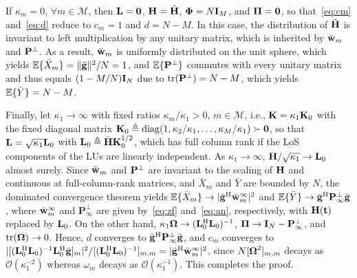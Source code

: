 \documentclass[journal]{IEEEtran}
\begin{document}
If $\kappa_m=0$, $\forall m\in\mathcal M$, then $\mathbf{L}=\mathbf 0$, $\mathbf{H}=\tilde{\mathbf{H}}$, $\boldsymbol{\Phi}=N\mathbf{I}_M$, and $\boldsymbol{\Pi}=\mathbf 0$, so that~\eqref{eq:cm} and~\eqref{eq:d} reduce to $c_m=1$ and $d=N-M$. In this case, the distribution of $\tilde{\mathbf{H}}$ is invariant to left multiplication by any unitary matrix, which is inherited by $\bar{\mathbf{w}}_m$ and $\mathbf{P}^{\perp}$. As a result, $\bar{\mathbf{w}}_m$ is uniformly distributed on the unit sphere, which yields $\mathbb{E}\{\bar X_m\}=\|\bar{\mathbf{g}}\|^2/N=1$, and $\mathbb{E}\{\mathbf{P}^{\perp}\}$ commutes with every unitary matrix and thus equals $(1-M/N)\mathbf{I}_N$ due to $\mathrm{tr}(\mathbf{P}^{\perp})=N-M$, which yields $\mathbb{E}\{\bar Y\}=N-M$.

Finally, let $\kappa_1\to\infty$ with fixed ratios $\kappa_m/\kappa_1>0$, $m\in\mathcal M$, i.e., $\mathbf{K}=\kappa_1\mathbf{K}_0$ with the fixed diagonal matrix $\mathbf{K}_0\triangleq\mathrm{diag}(1,\kappa_2/\kappa_1,\ldots,\kappa_M/\kappa_1)\succ\mathbf 0$, so that $\mathbf{L}=\sqrt{\kappa_1}\mathbf{L}_0$ with $\mathbf{L}_0\triangleq\bar{\mathbf{H}}\mathbf{K}_0^{1/2}$, which has full column rank if the LoS components of the LUs are linearly independent. As $\kappa_1\to\infty$, $\mathbf{H}/\sqrt{\kappa_1}\to\mathbf{L}_0$ almost surely. Since $\bar{\mathbf{w}}_m$ and $\mathbf{P}^{\perp}$ are invariant to the scaling of $\mathbf{H}$ and continuous at full-column-rank matrices, and $\bar X_m$ and $\bar Y$ are bounded by $N$, the dominated convergence theorem yields $\mathbb{E}\{\bar X_m\}\to|\bar{\mathbf{g}}^{\mathrm H}\bar{\mathbf{w}}_m^{\infty}|^2$ and $\mathbb{E}\{\bar Y\}\to\bar{\mathbf{g}}^{\mathrm H}\mathbf P_{\infty}^\perp\bar{\mathbf{g}}$, where $\bar{\mathbf{w}}_m^{\infty}$ and $\mathbf P_{\infty}^\perp$ are given by~\eqref{eq:zf} and~\eqref{eq:an}, respectively, with $\mathbf{H}(\mathbf{t})$ replaced by $\mathbf{L}_0$. On the other hand, $\kappa_1\boldsymbol{\Omega}\to(\mathbf{L}_0^{\mathrm H}\mathbf{L}_0)^{-1}$, $\boldsymbol{\Pi}\to\mathbf{I}_N-\mathbf P_{\infty}^\perp$, and $\mathrm{tr}(\boldsymbol{\Omega})\to0$. Hence, $d$ converges to $\bar{\mathbf{g}}^{\mathrm H}\mathbf P_{\infty}^\perp\bar{\mathbf{g}}$, and $c_m$ converges to $|[(\mathbf{L}_0^{\mathrm H}\mathbf{L}_0)^{-1}\mathbf{L}_0^{\mathrm H}\bar{\mathbf{g}}]_m|^2/[(\mathbf{L}_0^{\mathrm H}\mathbf{L}_0)^{-1}]_{m,m}=|\bar{\mathbf{g}}^{\mathrm H}\bar{\mathbf{w}}_m^{\infty}|^2$, since $N[\boldsymbol{\Omega}^2]_{m,m}$ decays as $\mathcal O(\kappa_1^{-2})$ whereas $\omega_m$ decays as $\mathcal O(\kappa_1^{-1})$. This completes the proof.

\end{document}
